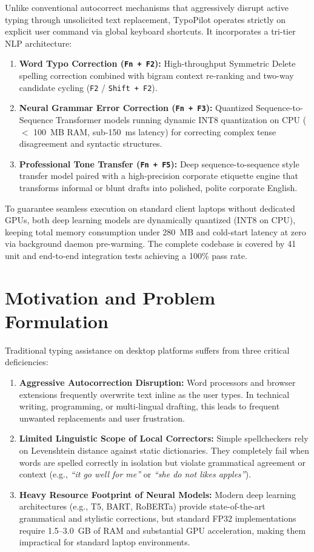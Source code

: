 \documentclass[11pt,a4paper]{article}
\begin{document}
Unlike conventional autocorrect mechanisms that aggressively disrupt active typing through unsolicited text replacement, TypoPilot operates strictly on explicit user command via global keyboard shortcuts. It incorporates a tri-tier NLP architecture:
\begin{enumerate}[noitemsep]
    \item \textbf{Word Typo Correction (\texttt{Fn + F2}):} High-throughput Symmetric Delete spelling correction combined with bigram context re-ranking and two-way candidate cycling (\texttt{F2} / \texttt{Shift + F2}).
    \item \textbf{Neural Grammar Error Correction (\texttt{Fn + F3}):} Quantized Sequence-to-Sequence Transformer models running dynamic INT8 quantization on CPU ($<$ 100~MB RAM, sub-150~ms latency) for correcting complex tense disagreement and syntactic structures.
    \item \textbf{Professional Tone Transfer (\texttt{Fn + F5}):} Deep sequence-to-sequence style transfer model paired with a high-precision corporate etiquette engine that transforms informal or blunt drafts into polished, polite corporate English.
\end{enumerate}

To guarantee seamless execution on standard client laptops without dedicated GPUs, both deep learning models are dynamically quantized (INT8 on CPU), keeping total memory consumption under 280~MB and cold-start latency at zero via background daemon pre-warming. The complete codebase is covered by 41 unit and end-to-end integration tests achieving a 100\% pass rate.

\section{Motivation and Problem Formulation}
Traditional typing assistance on desktop platforms suffers from three critical deficiencies:
\begin{enumerate}
    \item \textbf{Aggressive Autocorrection Disruption:} Word processors and browser extensions frequently overwrite text inline as the user types. In technical writing, programming, or multi-lingual drafting, this leads to frequent unwanted replacements and user frustration.
    \item \textbf{Limited Linguistic Scope of Local Correctors:} Simple spellcheckers rely on Levenshtein distance against static dictionaries. They completely fail when words are spelled correctly in isolation but violate grammatical agreement or context (e.g., \textit{``it go well for me''} or \textit{``she do not likes apples''}).
    \item \textbf{Heavy Resource Footprint of Neural Models:} Modern deep learning architectures (e.g., T5, BART, RoBERTa) provide state-of-the-art grammatical and stylistic corrections, but standard FP32 implementations require 1.5--3.0~GB of RAM and substantial GPU acceleration, making them impractical for standard laptop environments.
\end{enumerate}
\end{document}
